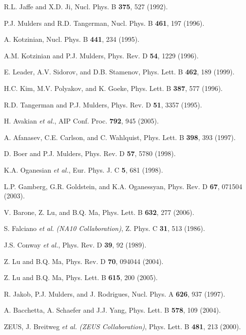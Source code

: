 \begin{thebibliography}{199}
R.L. Jaffe and X.D. Ji, Nucl. Phys. B {\bf 375}, 527 (1992).

P.J. Mulders and R.D. Tangerman, Nucl. Phys. B {\bf 461}, 197 (1996).

A. Kotzinian, Nucl. Phys. B {\bf 441}, 234 (1995).

A.M. Kotzinian and P.J. Mulders, Phys. Rev. D {\bf 54}, 1229 (1996).

E. Leader, A.V. Sidorov, and D.B. Stamenov, Phys. Lett. B {\bf 462},
189 (1999).

H.C. Kim, M.V. Polyakov, and K. Goeke, Phys. Lett. B {\bf 387}, 577 (1996).

R.D. Tangerman and P.J. Mulders, Phys. Rev. D {\bf 51}, 3357 (1995).

H. Avakian {\it et al.}, AIP Conf. Proc. {\bf 792}, 945 (2005).

A. Afanasev, C.E. Carlson, and C. Wahlquist, Phys. Lett. B {\bf 398},
393 (1997).

D. Boer and P.J. Mulders, Phys. Rev. D {\bf 57}, 5780 (1998).

K.A. Oganesian {\it et al.}, Eur. Phys. J. C {\bf 5}, 681 (1998).

L.P. Gamberg, G.R. Goldstein, and K.A. Oganessyan, Phys. Rev. D {\bf 67},
071504 (2003).

V. Barone, Z. Lu, and B.Q. Ma, Phys. Lett. B {\bf 632}, 277 (2006).

S. Falciano {\it et al.} {\it (NA10 Collaboration)}, Z. Phys. C {\bf 31},
513 (1986).

J.S. Conway {\it et al.}, Phys. Rev. D {\bf 39}, 92 (1989).

Z. Lu and B.Q. Ma, Phys. Rev. D {\bf 70}, 094044 (2004).

Z. Lu and B.Q. Ma, Phys. Lett. B {\bf 615}, 200 (2005).

R. Jakob, P.J. Mulders, and J. Rodrigues, Nucl. Phys. A {\bf 626}, 937 
(1997).

A. Bacchetta, A. Schaefer and J.J. Yang, Phys. Lett. B {\bf 578}, 109 
(2004).

ZEUS, J. Breitweg {\it et al.} {\it (ZEUS Collaboration)},
Phys. Lett. B {\bf 481}, 213 (2000).


\end{thebibliography}
